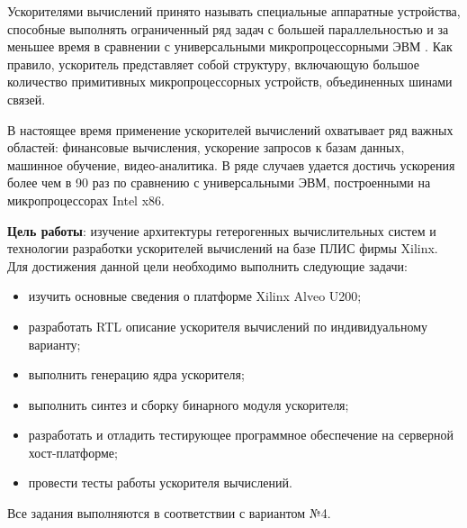 
Ускорителями вычислений принято называть специальные аппаратные устройства, способные выполнять ограниченный ряд задач с большей параллельностью и за меньшее время в сравнении с универсальными микропроцессорными ЭВМ . Как правило, ускоритель представляет собой структуру, включающую большое количество примитивных микропроцессорных устройств, объединенных шинами связей.

В настоящее время применение ускорителей вычислений охватывает ряд важных областей: финансовые вычисления, ускорение запросов к базам данных, машинное обучение, видео-аналитика. В ряде случаев удается достичь ускорения более чем в 90 раз по сравнению с универсальными ЭВМ, построенными на микропроцессорах Intel x86.

\textbf{Цель работы}: изучение архитектуры гетерогенных вычислительных систем и технологии разработки ускорителей вычислений на базе ПЛИС фирмы Xilinx.
Для достижения данной цели необходимо выполнить следующие задачи:
\begin{itemize}
\item изучить основные сведения о платформе Xilinx Alveo U200;
\item разработать RTL описание ускорителя вычислений по индивидуальному варианту;
\item выполнить генерацию ядра ускорителя;
\item выполнить синтез и сборку бинарного модуля ускорителя;
\item разработать и отладить тестирующее программное обеспечение на серверной хост-платформе;
\item провести тесты работы ускорителя вычислений.
\end{itemize}

Все задания выполняются в соответствии с вариантом №4.

